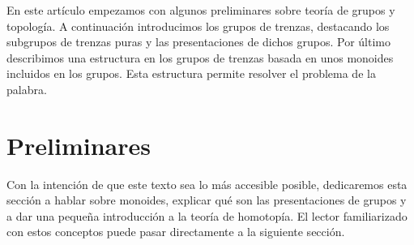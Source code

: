 \documentclass[bibtex, anon]{TEMat-article}
\begin{document}
En este artículo empezamos con algunos preliminares sobre teoría de grupos y topología. A continuación introducimos los grupos de trenzas, destacando los subgrupos de trenzas puras y las presentaciones de dichos grupos. Por último describimos una estructura en los grupos de trenzas basada en unos monoides incluidos en los grupos. Esta estructura permite resolver el problema de la palabra.
%

\section{Preliminares}

Con la intención de que este texto sea lo más accesible posible, dedicaremos esta sección a hablar sobre monoides, explicar qué son las presentaciones de grupos y a dar una pequeña introducción a la teoría de homotopía. El lector familiarizado con estos conceptos puede pasar directamente a la siguiente sección. 
\end{document}

